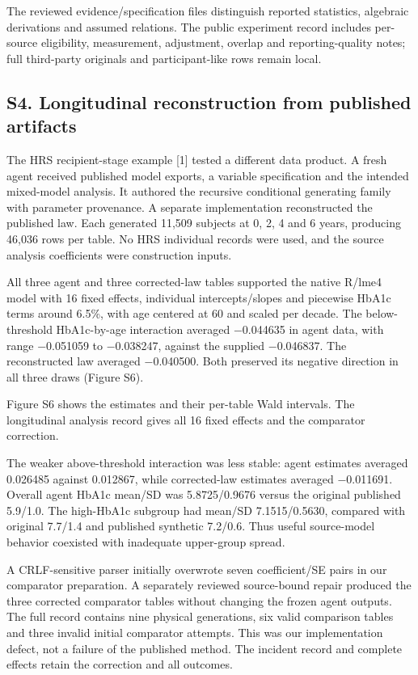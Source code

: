 \documentclass[11pt,letterpaper]{article}
\begin{document}
\endgroup

The reviewed evidence/\allowbreak{}specification files distinguish reported statistics, algebraic derivations and assumed relations. The public experiment record includes per-source eligibility, measurement, adjustment, overlap and reporting-quality notes; full third-party originals and participant-like rows remain local.


\subsection*{S4. Longitudinal reconstruction from published artifacts}

The HRS recipient-stage example [1] tested a different data product. A fresh agent received published model exports, a variable specification and the intended mixed-model analysis. It authored the recursive conditional generating family with parameter provenance. A separate implementation reconstructed the published law. Each generated 11,509 subjects at 0, 2, 4 and 6 years, producing 46,036 rows per table. No HRS individual records were used, and the source analysis coefficients were construction inputs.


All three agent and three corrected-law tables supported the native R/\allowbreak{}lme4 model with 16 fixed effects, individual intercepts/\allowbreak{}slopes and piecewise HbA1c terms around 6.5\%, with age centered at 60 and scaled per decade. The below-threshold HbA1c-by-age interaction averaged −0.044635 in agent data, with range −0.051059 to −0.038247, against the supplied −0.046837. The reconstructed law averaged −0.040500. Both preserved its negative direction in all three draws (Figure S6).


Figure S6 shows the estimates and their per-table Wald intervals. The longitudinal analysis record gives all 16 fixed effects and the comparator correction.


The weaker above-threshold interaction was less stable: agent estimates averaged 0.026485 against 0.012867, while corrected-law estimates averaged −0.011691. Overall agent HbA1c mean/\allowbreak{}SD was 5.8725/\allowbreak{}0.9676 versus the original published 5.9/\allowbreak{}1.0. The high-HbA1c subgroup had mean/\allowbreak{}SD 7.1515/\allowbreak{}0.5630, compared with original 7.7/\allowbreak{}1.4 and published synthetic 7.2/\allowbreak{}0.6. Thus useful source-model behavior coexisted with inadequate upper-group spread.


A CRLF-sensitive parser initially overwrote seven coefficient/\allowbreak{}SE pairs in our comparator preparation. A separately reviewed source-bound repair produced the three corrected comparator tables without changing the frozen agent outputs. The full record contains nine physical generations, six valid comparison tables and three invalid initial comparator attempts. This was our implementation defect, not a failure of the published method. The incident record and complete effects retain the correction and all outcomes.
\end{document}
